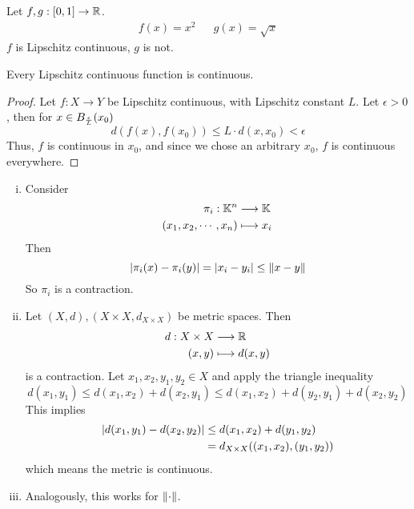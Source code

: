 \documentclass[../../script.tex]{subfiles}
\begin{document}
\begin{eg}
    Let $f, g: [0, 1] \rightarrow \realn$.
    \begin{align*}
        f(x) = x^2 && g(x) = \sqrt{x}
    \end{align*}
    $f$ is Lipschitz continuous, $g$ is not.
\end{eg}

\begin{thm}
    Every Lipschitz continuous function is continuous.
\end{thm}
\begin{proof}
    Let $f: X \rightarrow Y$ be Lipschitz continuous, with Lipschitz constant $L$. Let $\epsilon > 0$, 
    then for $x \in \oball[\frac{\epsilon}{L}](x_0)$
    \begin{equation}
        d(f(x), f(x_0)) \le L \cdot d(x, x_0) < \epsilon
    \end{equation}
    Thus, $f$ is continuous in $x_0$, and since we chose an arbitrary $x_0$, $f$ is continuous everywhere.
\end{proof}

\begin{eg}
    \begin{enumerate}[(i)]
        \item Consider 
        \begin{align*}
            \pi_i: \field^n &\longrightarrow \field \\
            (x_1, x_2, \cdots, x_n) &\longmapsto x_i
        \end{align*}
        Then 
        \[
            \abs{\pi_i(x) - \pi_i(y)} = \abs{x_i - y_i} \le \norm{x - y}
        \]
        So $\pi_i$ is a contraction.

        \item Let $(X, d), (X \times X, d_{X \times X})$ be metric spaces. Then 
        \begin{align*}
            d: X \times X &\longrightarrow \realn \\
            (x, y) &\longmapsto d(x, y)
        \end{align*}
        is a contraction. Let $x_1, x_2, y_1, y_2 \in X$ and apply the triangle inequality
        \[
            d(x_1, y_1) \le d(x_1, x_2) + d(x_2, y_1) \le d(x_1, x_2) + d(y_2, y_1) + d(x_2, y_2)
        \]
        This implies 
        \begin{align*}
            \abs{d(x_1, y_1) - d(x_2, y_2)} &\le d(x_1, x_2) + d(y_1, y_2) \\
            &= d_{X \times X} ((x_1, x_2), (y_1, y_2))
        \end{align*}
        which means the metric is continuous.

        \item Analogously, this works for $\dnorm$.
    \end{enumerate}
\end{eg}
\end{document}
